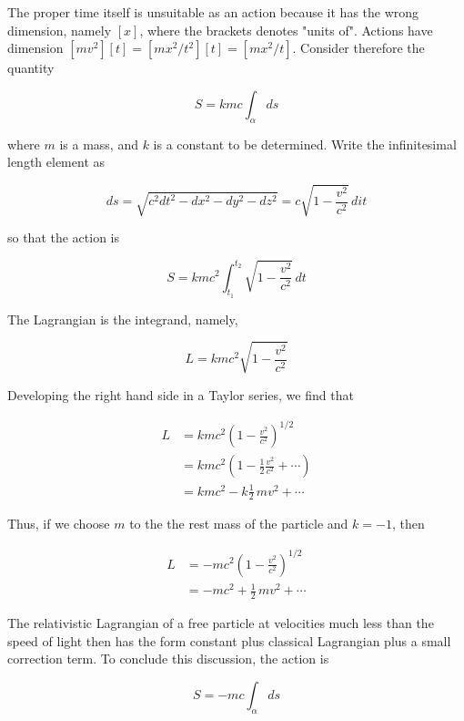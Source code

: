 The proper time itself is unsuitable as an action because it has the wrong dimension, namely $[x]$, where the brackets denotes "units of". Actions have dimension $[mv^2][t] = [mx^2 / t^2][t] = [mx^2/t]$.  Consider therefore the quantity

\begin{equation}
S = kmc \int_\alpha ds
\end{equation}

where $m$ is a mass, and $k$ is a constant to be determined.  Write the infinitesimal length element as 

\begin{equation}
ds = \sqrt{c^2 dt^2 - dx^2 - dy^2 - dz^2} = c\sqrt{1 - \frac{ v^2}{ c^2}}\,dit
\end{equation}

so that the action is

\begin{equation}
S = kmc^2 \int_{t_1}^{t_2}\sqrt{1 - \frac{ v^2}{ c^2}}\,dt
\end{equation}

The Lagrangian is the integrand, namely,

\begin{equation}
L = kmc^2 \sqrt{1 - \frac{ v^2}{ c^2}}
\end{equation}

Developing the right hand side in a Taylor series, we find that

\begin{align}
L &= kmc^2 \left(1 - \frac{ v^2}{ c^2 }\right)^{1/2 } \\
 &= kmc^2 \left(1 - \frac{1}{2}\frac{ v^2}{ c^2} + \cdots\right) \\
 &= kmc^2 - k\frac{1}{2}\,mv^2 + \cdots
\end{align}

Thus, if we choose $m$ to the the rest mass of the particle and $k = -1$, then

\begin{align}
L &= -mc^2 \left(1 - \frac{ v^2}{ c^2 }\right)^{1/2 } \\
& =  -mc^2  + \frac{1}{2}\,mv^2 + \cdots
\end{align}

The relativistic Lagrangian of a free particle at velocities much less than the speed of light then has the form constant plus classical Lagrangian plus a small correction term.  To conclude this discussion, the action is

\begin{equation}
S = -mc\int_\alpha ds
\end{equation}

